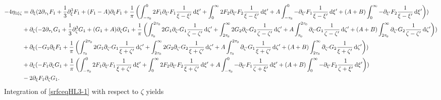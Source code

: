 \documentclass[10pt,reqno,oneside,a4paper, landscape]{article}
\begin{document}
\begin{equation}\label{srfceqHL3-1}
\begin{aligned}
- 4\eta_{1\xi \zeta} &= \partial_\xi (2 \partial_{\tau_1}F_1 + \frac{1}{3} \partial_\xi^3 F_1 + (F_1-A)\partial_\xi F_1 + \frac{1}{\pi} \left(\int^0_{-\tau_0} 2 F_1 \partial_{\xi'} F_1 \frac{1}{\xi -\xi'} \,\mathrm{d} \xi' + \int^{\infty}_{0} 2 F_2 \partial_{\xi'} F_2 \frac{1}{\xi -\xi'} \,\mathrm{d} \xi' +  A \int^0_{-\tau_0} -\partial_{\xi'} F_1 \frac{1}{\xi - \xi'} \,\mathrm{d} \xi' + (A+B)\int_0^{\infty} -\partial_{\xi'} F_2 \frac{1}{\xi - \xi'} \,\mathrm{d} \xi'  \right))  \\
&+ \partial_\zeta(- 2 \partial_{\tau_1} G_1 +  \frac{1}{3} \partial_\zeta^3 G_1+ (G_1 +A)\partial_{\zeta} G_1  + \frac{1}{\pi} \left( \int^{2\tau_0}_{\tau_0} 2 G_1 \partial_{\zeta'} G_1 \frac{1}{\zeta -\zeta'} \,\mathrm{d} \zeta' + \int^{\infty}_{2\tau_0} 2 G_2 \partial_{\zeta'} G_2 \frac{1}{\zeta -\zeta'} \,\mathrm{d} \zeta' + A \int^{2\tau_0}_{\tau_0} \partial_{\zeta'} G_1 \frac{1}{\zeta - \zeta'} \,\mathrm{d} \zeta'+(A+B) \int_{2\tau_0}^{\infty} \partial_{\zeta'} G_2 \frac{1}{\zeta - \zeta'}\,\mathrm{d} \zeta'\right)) \\
&+ \partial_{\xi}(-G_1 \partial_\xi F_1 + \frac{1}{\pi}\left(\int^{2\tau_0}_{\tau_0} 2 G_1 \partial_{\zeta'} G_1 \frac{1}{\xi + \zeta'} \,\mathrm{d} \zeta' + \int^{\infty}_{2\tau_0} 2 G_2 \partial_{\zeta'} G_2 \frac{1}{\xi + \zeta'} \,\mathrm{d} \zeta'
+ A\int^{2\tau_0}_{\tau_0} \partial_{\zeta'} G_1 \frac{1}{\xi + \zeta'} \,\mathrm{d} \zeta' + (A+B) \int_{2\tau_0}^{\infty} \partial_{\zeta'} G_2 \frac{1}{\xi + \zeta'} \,\mathrm{d} \zeta' \right) ) \\
&+ \partial_{\zeta}( - F_1\partial_\zeta G_1 + \frac{1}{\pi} \left(\int^0_{-\tau_0} 2 F_1 \partial_{\xi'} F_1 \frac{1}{\xi + \zeta'} \,\mathrm{d} \xi' + \int^{\infty}_{0} 2 F_2 \partial_{\xi'} F_2 \frac{1}{\xi + \zeta'} \,\mathrm{d} \xi' + A \int^0_{-\tau_0} -\partial_{\xi'} F_1  \frac{1}{\zeta + \xi'}  \,\mathrm{d} \xi'  + (A+B) \int_0^{\infty} -\partial_{\xi'} F_2  \frac{1}{\zeta + \xi'} \,\mathrm{d} \xi'  \right)) \\
&- 2 \partial_\xi F_1 \partial_\zeta G_1. 
\end{aligned}
\end{equation}
Integration of \eqref{srfceqHL3-1} with respect to $\zeta$ yields
\end{document}
